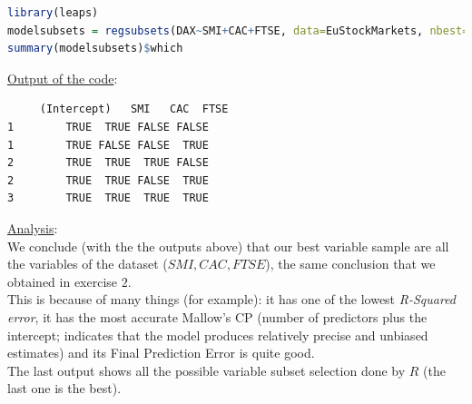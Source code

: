 \documentclass[a4paper, 11pt]{article}
\begin{document}
\begin{lstlisting}[language=R]
library(leaps)
modelsubsets = regsubsets(DAX~SMI+CAC+FTSE, data=EuStockMarkets, nbest=2)
summary(modelsubsets)$which
\end{lstlisting}
\vspace{1em}
\underline{Output of the code}:
\small\begin{verbatim}
     (Intercept)   SMI   CAC  FTSE
1        TRUE  TRUE FALSE FALSE
1        TRUE FALSE FALSE  TRUE
2        TRUE  TRUE  TRUE FALSE
2        TRUE  TRUE FALSE  TRUE
3        TRUE  TRUE  TRUE  TRUE
\end{verbatim}
\vspace{1em}
\underline{Analysis}:\\
We conclude (with the the outputs above) that our best variable sample are all the variables of the dataset ($SMI, CAC, FTSE$), the same conclusion that we obtained in exercise $2$.\\
This is because of many things (for example): it has one of the lowest \textit{R-Squared error}, it has the most accurate Mallow's CP (number of predictors plus the intercept; indicates that the model produces relatively precise and unbiased estimates) and its Final Prediction Error is quite good.\\
The last output shows all the possible variable subset selection done by $R$ (the last one is the best).
\end{document}
